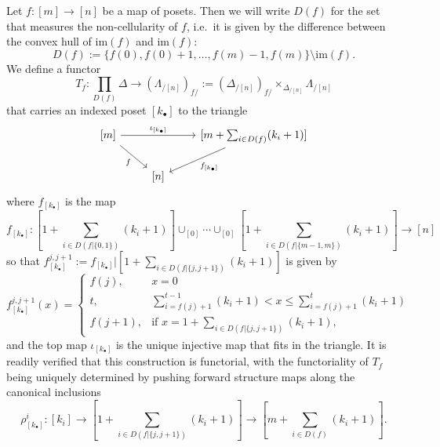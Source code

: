 \documentclass[a4paper, 11pt]{amsart}
\numberwithin{theorem}{section}
\theoremstyle{definition}
\newcommand{\im}{\mathrm{im}}
\begin{document}
\begin{construction}\label{con.conduche-modules-finality}
	Let $f : [m] \rightarrow [n]$ be a map of posets. Then we will write $D(f)$ for the set that measures the non-cellularity of $f$, 
	i.e.\, it is given by the difference between the convex hull of $\im(f)$ and $\im(f)$:
	$$
		D(f) := \{f(0), f(0)+1,\dotsc, f(m)-1, f(m)\} \setminus \im(f).
	$$
	We define a functor
	$$
	\textstyle T_f : \prod_{D(f)}\Delta \rightarrow (\Lambda_{/[n]})_{f/} := (\Delta_{/[n]})_{f/} \times_{\Delta_{/[n]}} \Lambda_{/[n]}
	$$
	that carries an indexed poset $[k_\bullet]$ to the triangle
	\[
	\begin{tikzcd}
		{[m]} \arrow[rr,"{\iota_{[k_\bullet]}}"]\arrow[dr, "f"'] && {[m + \sum_{i \in D(f)} (k_i + 1)]} \arrow[dl, "{f_{[k_\bullet]}}"] \\ 
		& {[n]}
	\end{tikzcd}
	\]
	where $f_{[k_\bullet]}$ is the map
	$$
	\textstyle f_{[k_\bullet]} : [1+\sum_{i \in D(f|\{0,1\})} (k_i + 1)] \cup_{[0]} \dotsb \cup_{[0]} [1 + \sum_{i \in D(f|\{m-1,m\})} (k_i + 1)] \rightarrow [n]
	$$
	so that $f^{j,j+1}_{[k_\bullet]} := f_{[k_\bullet]}|[1 + \sum_{i \in D(f|\{j,j+1\})}( k_i+1)]$ is given by 
	$$
	f^{j,j+1}_{[k_\bullet]}(x) = \begin{cases}
		f(j), & x = 0 \\
		t, & \sum_{i=f(j)+1}^{t-1} (k_i + 1) < x \leq \sum_{i=f(j)+1}^t(k_i+1) \\
		f(j+1), & \text{if } x= 1 + \sum_{i \in D(f|\{j,j+1\})} (k_i + 1),
	\end{cases}
	$$
	and the top map $\iota_{[k_\bullet]}$ is the unique injective map that fits in the triangle. It is readily verified 
	that this construction is functorial, with the functoriality 
	of $T_f$ being uniquely determined by pushing forward structure maps along the
	 canonical inclusions $$\textstyle \rho^i_{[k_\bullet]} : [k_i] \rightarrow [1 + \sum_{i \in D(f|\{j,j+1\})}( k_i+1)] \rightarrow [m + \sum_{i \in D(f)} (k_i + 1)].$$
\end{construction}
\end{document}
